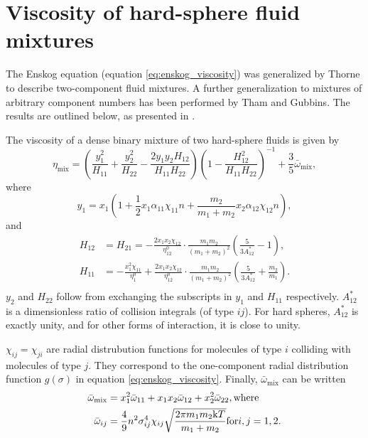 \section{Viscosity of hard-sphere fluid mixtures}
The Enskog equation (equation \eqref{eq:enskog_viscosity}) 
was generalized by Thorne to describe two-component fluid 
mixtures\cite{ref:chapman:non_uniform_gases}.
A further generalization to mixtures of arbitrary 
component numbers has been performed by Tham and 
Gubbins\cite{ref:tham:fluid_mixtures}. The results 
are outlined below, as presented in 
\cite{ref:pippo:composition_dependence}.

The viscosity of a dense binary mixture 
of two hard-sphere fluids is given by
\[
    \label{eq:thorne_viscosity}
    \eta_{\text{mix}} 
        = \left(
            \frac{y_1^2}{H_{11}} 
            + \frac{y_2^2}{H_{22}} 
            - \frac{2 y_1 y_2 H_{12}}{H_{11} H_{22}}
        \right)
        \left(
            1 - \frac{H_{12}^2}{H_{11} H_{22}}
        \right)^{-1}
        + \frac{3}{5} \bar{\omega}_{\text{mix}},
\]
where
\[
    y_1 
        = x_1 \left(
            1   + \frac{1}{2} x_1 \alpha_{11} \chi_{11} n 
                + \frac{m_2}{m_1 + m_2} x_2 \alpha_{12} \chi_{12} n
        \right), 
\]
and
\[
    \begin{split}
        H_{12} &= H_{21}
                =   -\frac{2 x_1 x_2 \chi_{12}}{\eta^0_{12}}
                    \cdot \frac{m_1 m_2}{(m_1 + m_2)^2}
                    \left( \frac{5}{3A^*_{12}} - 1 \right), \\
        H_{11}
                &=  -\frac{x_1^2 \chi_{11}}{\eta^0_1}
                    +\frac{2 x_1 x_2 \chi_{12}}{\eta^0_{12}}
                    \cdot \frac{m_1 m_2}{(m_1 + m_2)^2}
                    \left( \frac{5}{3A^*_{12}} + \frac{m_2}{m_1} \right). \\
    \end{split}
\]
$y_2$ and $H_{22}$ follow from exchanging the subscripts in $y_1$ and $H_{11}$ 
respectively.
$A^*_{12}$ is a dimensionless ratio of collision integrals (of type ${ij}$).
For hard spheres, $A^*_{12}$ is exactly unity, and for other forms of 
interaction, it is close to unity. %

$\chi_{ij} = \chi_{ji}$ are radial distrubution 
functions for molecules of type $i$ colliding 
with molecules of type $j$.
They correspond to the one-component radial 
distribution function $g(\sigma)$ in equation 
\eqref{eq:enskog_viscosity}.
Finally, $\bar{\omega}_{\text{mix}}$ can be written
\[
    \begin{split}
        \bar{\omega}_{\text{mix}} 
            &= x_1^2 \bar{\omega}_{11} 
            + x_1 x_2 \bar{\omega}_{12} 
            + x_2^2 \bar{\omega}_{22}, \text{where}\\
        \bar{\omega}_{ij} 
            &= \frac{4}{9} n^2 \sigma_{ij}^4 \chi_{ij} 
            \sqrt{\frac{2\pi m_1 m_2 \mathrm{k} T}{m_1 + m_2}} 
            \text{for} i,j = 1,2.
    \end{split}
\]

